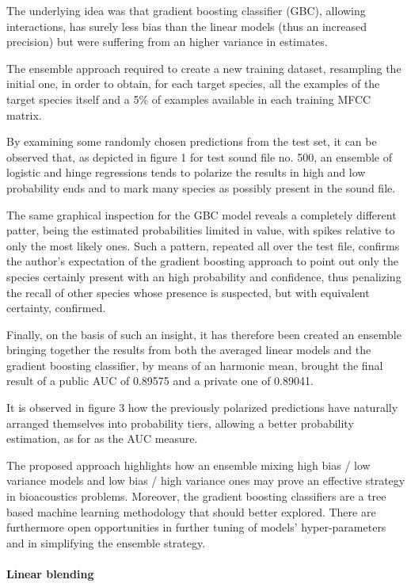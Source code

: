 The underlying idea was that gradient boosting classifier (GBC), allowing interactions, has
surely less bias than the linear models (thus an increased precision) but were suffering from
an higher variance in estimates.

The ensemble approach required to create a new training dataset, resampling the initial one,
in order to obtain, for each target species, all the examples of the target species itself and a
5\% of examples available in each training MFCC matrix.

By examining some randomly chosen predictions from the test set, it can be observed that, as
depicted in figure 1 for test sound file no. 500, an ensemble of logistic and hinge
regressions tends to polarize the results in high and low probability ends and to mark many
species as possibly present in the sound file.

The same graphical inspection for the GBC model reveals a completely different patter,
being the estimated probabilities limited in value, with spikes relative to only the most likely
ones. Such a pattern, repeated all over the test file, confirms the author’s expectation of the
gradient boosting approach to point out only the species certainly present with an high
probability and confidence, thus penalizing the recall of other species whose presence is
suspected, but with equivalent certainty, confirmed.

Finally, on the basis of such an insight, it has therefore been created an ensemble bringing
together the results from both the averaged linear models and the gradient boosting
classifier, by means of an harmonic mean, brought the final result of a public AUC of
0.89575 and a private one of 0.89041.

It is observed in figure 3 how the previously polarized predictions have naturally arranged
themselves into probability tiers, allowing a better probability estimation, as for as the AUC
measure.

The proposed approach highlights how an ensemble mixing high bias / low variance models
and low bias / high variance ones may prove an effective strategy in bioacoustics problems.
Moreover, the gradient boosting classifiers are a tree based machine learning methodology
that should better explored. There are
furthermore open opportunities in further tuning of models’ hyper-parameters and in
simplifying the ensemble strategy.

\paragraph{Linear blending \cite{chennovel13}}

